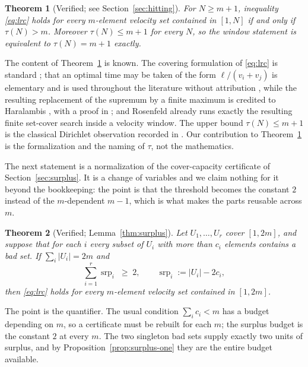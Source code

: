 \documentclass[11pt]{amsart}
\theoremstyle{plain}
\newtheorem{theorem}{Theorem}[section]
\theoremstyle{definition}
\newcommand{\srp}{\operatorname{srp}}
\begin{document}
\begin{theorem}[Verified; see Section~\ref{sec:hitting}]\label{thm:main-equiv}
For $N \ge m+1$, inequality \eqref{eq:lrc} holds for every $m$-element velocity set contained in
$[1,N]$ if and only if $\tau(N) > m$. Moreover $\tau(N) \le m+1$ for every $N$, so the window
statement is equivalent to $\tau(N) = m+1$ exactly.
\end{theorem}

The content of Theorem~\ref{thm:main-equiv} is known. The covering formulation of \eqref{eq:lrc} is
standard \cite{Tao}; that an optimal time may be taken of the form $\ell/(v_i+v_j)$ is elementary
and is used throughout the literature without attribution \cite[eq.~(4)]{PS}, while the resulting
replacement of the supremum by a finite maximum is credited to Haralambis \cite[Remark 1]{Har},
with a proof in \cite[Theorem 6]{CG}; and Rosenfeld \cite[\S6, Lemma 7]{Ros8} already runs exactly
the resulting finite set-cover search inside a velocity window. The upper bound $\tau(N) \le m+1$ is
the classical Dirichlet observation recorded in \cite[\S4]{PS}. Our contribution to
Theorem~\ref{thm:main-equiv} is the formalization and the naming of $\tau$, not the mathematics.

The next statement is a normalization of the cover-capacity certificate of
Section~\ref{sec:surplus}. It is a change of variables and we claim nothing for it beyond the
bookkeeping: the point is that the threshold becomes the constant $2$ instead of the $m$-dependent
$m-1$, which is what makes the parts reusable across $m$.

\begin{theorem}[Verified; Lemma~\ref{thm:surplus}]\label{thm:main-surplus}
Let $U_1,\dots,U_r$ cover $[1,2m]$, and suppose that for each $i$ every subset of $U_i$ with more
than $c_i$ elements contains a bad set. If $\sum_i |U_i| = 2m$ and
\[
  \sum_{i=1}^{r} \srp_i \;\ge\; 2, \qquad \srp_i := |U_i| - 2c_i,
\]
then \eqref{eq:lrc} holds for every $m$-element velocity set contained in $[1,2m]$.
\end{theorem}

The point is the quantifier. The usual condition $\sum_i c_i < m$ has a budget depending on $m$, so
a certificate must be rebuilt for each $m$; the surplus budget is the constant $2$ at every $m$. The
two singleton bad sets supply exactly two units of surplus, and by Proposition~\ref{prop:surplus-one}
they are the entire budget available.
\end{document}
